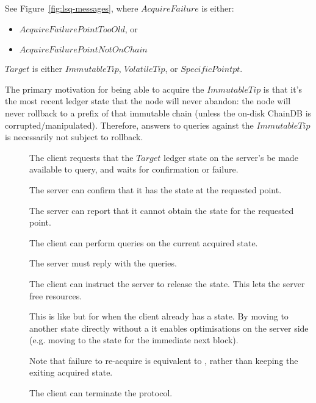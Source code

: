 See Figure~\ref{fig:lsq-messages}, where $AcquireFailure$ is either:
\begin{itemize}
  \item $AcquireFailurePointTooOld$, or
  \item $AcquireFailurePointNotOnChain$
\end{itemize}
$Target$ is either $ImmutableTip$, $VolatileTip$, or $SpecificPoint pt$.

The primary motivation for being able to acquire the $ImmutableTip$ is that
it's the most recent ledger state that the node will never abandon: the node
will never rollback to a prefix of that immutable chain (unless the on-disk
ChainDB is corrupted/manipulated). Therefore, answers to queries against the
$ImmutableTip$ is necessarily not subject to rollback.

\begin{description}
  \item [\MsgAcquire{}]
    The client requests that the $Target$ ledger state on the server's be made
    available to query, and waits for confirmation or failure.
  \item [\MsgAcquired{}]
    The server can confirm that it has the state at the requested point.
  \item [\MsgFailure{}]
    The server can report that it cannot obtain the state for the requested
    point.
  \item [\MsgQuery{}]
    The client can perform queries on the current acquired state.
  \item [\MsgResult{}]
    The server must reply with the queries.
  \item [\MsgRelease{}]
    The client can instruct the server to release the state. This lets the
    server free resources.
  \item [\MsgReAcquire{}]
    This is like \MsgAcquire{} but for when the client already has a state. By
    moving to another state directly without a \MsgRelease{} it
    enables optimisations on the server side (e.g. moving to the state for
    the immediate next block).

    Note that failure to re-acquire is equivalent to \MsgRelease{},
    rather than keeping the exiting acquired state.
  \item [\MsgDone{}]
    The client can terminate the protocol.
\end{description}


